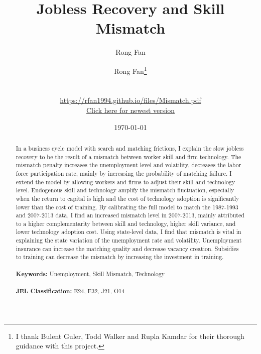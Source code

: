 \documentclass[12pt]{article}
\date{}
\author{Rong Fan}
\newcommand{\1}{\mathbb{1}}
\begin{document}
\begin{titlepage}
\title{Jobless Recovery and Skill Mismatch}
\author{Rong Fan\thanks{I thank Bulent Guler, Todd Walker and Rupla Kamdar for their thorough guidance with this project.} 
\\
\\
\\ \href{https://rfan1994.github.io/files/Mismatch.pdf}{https://rfan1994.github.io/files/Mismatch.pdf}
\\ \href{https://rfan1994.github.io/files/Mismatch.pdf}{Click here for newest version}}
\date{\today}
\maketitle

\begin{abstract}
\noindent In a business cycle model with search and matching frictions, I explain the slow jobless recovery to be the result of a mismatch between worker skill and firm technology. The mismatch penalty increases the unemployment level and volatility, decreases the labor force participation rate, mainly by increasing the probability of matching failure. I extend the model by allowing workers and firms to adjust their skill and technology level. Endogenous skill and technology amplify the mismatch fluctuation, especially when the return to capital is high and the cost of technology adoption is significantly lower than the cost of training. By calibrating the full model to match the 1987-1993 and 2007-2013 data, I find an increased mismatch level in 2007-2013, mainly attributed to a higher complementarity between skill and technology, higher skill variance, and lower technology adoption cost. Using state-level data, I find that mismatch is vital in explaining the state variation of the unemployment rate and volatility. Unemployment insurance can increase the matching quality and decrease vacancy creation. Subsidies to training can decrease the mismatch by increasing the investment in training.  \\
\vspace{0in}\\
\noindent\textbf{Keywords:} Unemployment, Skill Mismatch, Technology\\
\vspace{0in}\\
\noindent\textbf{JEL Classification: } E24, E32, J21, O14\\

\bigskip
\end{abstract}
\setcounter{page}{0}
\thispagestyle{empty}
\end{titlepage}
\pagebreak \newpage
\end{document}
